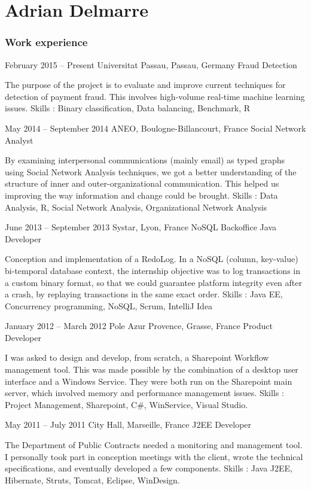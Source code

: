\documentclass{tccv}
\begin{document}
\part{Adrian Delmarre}

\section{Work experience}

\begin{eventlist}

\item{February 2015 -- Present}
     {Universitat Passau, Passau, Germany}
     {Fraud Detection}
     
The purpose of the project is to evaluate and improve current techniques for detection of payment fraud. This involves high-volume real-time machine learning issues.
Skills : Binary classification, Data balancing, Benchmark, R

\item{May 2014 -- September 2014}
     {ANEO, Boulogne-Billancourt, France}
     {Social Network Analyst}
     
By examining interpersonal communications (mainly email) as typed graphs using Social Network Analysis techniques, we got a better understanding of the structure of inner and outer-organizational communication. This helped us improving the way information and change could be brought.
Skills : Data Analysis, R, Social Network Analysis, Organizational Network Analysis

\item{June 2013 -- September 2013}
     {Systar, Lyon, France}
     {NoSQL Backoffice Java Developer}
     
Conception and implementation of a RedoLog.
In a NoSQL (column, key-value) bi-temporal database context, the internship objective was to log transactions in a custom binary format, so that we could guarantee platform integrity even after a crash, by replaying transactions in the same exact order.
Skills : Java EE, Concurrency programming, NoSQL, Scrum, IntelliJ Idea

\item{January 2012 -- March 2012}
     {Pole Azur Provence, Grasse, France}
     {Product Developer}
     
I was asked to design and develop, from scratch, a Sharepoint Workflow management tool. This was made possible by the combination of a desktop user interface and a Windows Service. They were both run on the Sharepoint main server, which involved memory and performance management issues.
Skills : Project Management, Sharepoint, C\#, WinService, Visual Studio.

\item{May 2011 -- July 2011}
     {City Hall, Marseille, France}
     {J2EE Developer}
     
The Department of Public Contracts needed a monitoring and management tool.
I personally took part in conception meetings with the client, wrote the technical specifications, and eventually developed a few components.
Skills : Java J2EE, Hibernate, Struts, Tomcat, Eclipse, WinDesign.

\end{eventlist}
\end{document}
